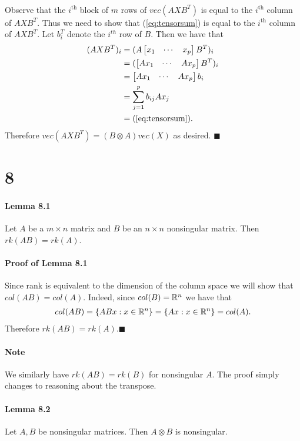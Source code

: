 \documentclass[letterpaper,12pt,oneside,onecolumn]{article}
\begin{document}
\paragraph{}
Observe that the $i^\text{th}$ block of $m$ rows of $vec(AXB^T)$ is equal to the $i^\text{th}$ column of $AXB^T$. Thus we need to show that (\ref{eq:tensorsum}) is equal to the $i^\text{th}$ column of $AXB^T$. Let $b_i^T$ denote the $i^{th}$ row of $B$. Then we have that
\begin{align*}
(AXB^T)_i &= (A\begin{bmatrix} x_1 & \cdots & x_p\end{bmatrix}B^T)_i \\
&=(\begin{bmatrix} Ax_1 &\cdots & Ax_p \end{bmatrix} B^T)_i \\
&= \begin{bmatrix} Ax_1 &\cdots & Ax_p \end{bmatrix} b_i \\
&= \sum_{j=1}^p b_{ij}Ax_j \\
&= (\ref{eq:tensorsum}). 
\end{align*}
Therefore $vec(AXB^T) = (B \otimes A)vec(X)$ as desired. $\blacksquare$
\section*{8}
\paragraph{Lemma 8.1}
Let $A$ be a $m\times n$ matrix and $B$ be an $n \times n$ nonsingular matrix. Then $rk(AB) = rk(A)$.
\paragraph{Proof of Lemma 8.1}
Since rank is equivalent to the dimension of the column space we will show that $col(AB) = col(A)$. Indeed, since $col(B) = \mathbb{R}^n$ we have that
\begin{align*}
col(AB) = \{ABx : x \in \mathbb{R}^n\} = \{Ax : x \in \mathbb{R}^n\} = col(A).
\end{align*}
Therefore $rk(AB) = rk(A)$.$\blacksquare$
\paragraph{Note}
We similarly have $rk(AB) = rk(B)$ for nonsingular $A$. The proof simply changes to reasoning about the transpose.
\paragraph{Lemma 8.2}
Let $A,B$ be nonsingular matrices. Then $A \otimes B$ is nonsingular.
\end{document}
